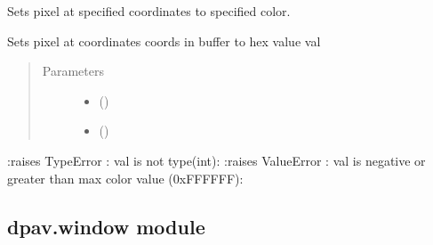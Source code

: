 \documentclass[letterpaper,10pt,english]{sphinxmanual}
\begin{document}
\begin{fulllineitems}

\begin{fulllineitems}
\label{\detokenize{dpav:dpav.vbuffer.VBuffer.write_pixel}}
\sphinxAtStartPar
Sets pixel at specified coordinates to specified color.

\sphinxAtStartPar
Sets pixel at coordinates coords in buffer to hex value val
\begin{quote}\begin{description}
\item[{Parameters}] \leavevmode\begin{itemize}
\item {} 
\sphinxAtStartPar
{} (\sphinxstyleliteralemphasis{\sphinxupquote{ (}}\sphinxstyleliteralemphasis{\sphinxupquote{)}}) \textendash{} 

\item {} 
\sphinxAtStartPar
{} () \textendash{} 

\end{itemize}

\end{description}\end{quote}

\sphinxAtStartPar
:raises TypeError : val is not type(int):
:raises ValueError : val is negative or greater than max color value (0xFFFFFF):

\end{fulllineitems}


\end{fulllineitems}



\subsection{dpav.window module}
\label{\detokenize{dpav:module-dpav.window}}\label{\detokenize{dpav:dpav-window-module}}
\end{document}
